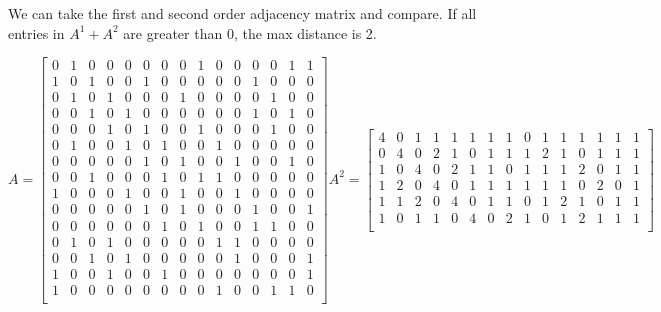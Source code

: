 \documentclass[answers]{exam}
\begin{document}
\begin{questions}
\begin{solution}
			We can take the first and second order adjacency matrix and compare. If all entries in $A^1 + A^2$ are greater than 0, the max distance is 2.
				
				{\setlength{\arraycolsep}{2pt} \[
				A = \begin{bmatrix}
				0 & 1 & 0 & 0 & 0 & 0 & 0 & 0 & 1 & 0 & 0 & 0 & 0 & 1 & 1 \\
				1 & 0 & 1 & 0 & 0 & 1 & 0 & 0 & 0 & 0 & 0 & 1 & 0 & 0 & 0 \\
				0 & 1 & 0 & 1 & 0 & 0 & 0 & 1 & 0 & 0 & 0 & 0 & 1 & 0 & 0 \\
				0 & 0 & 1 & 0 & 1 & 0 & 0 & 0 & 0 & 0 & 0 & 1 & 0 & 1 & 0 \\
				0 & 0 & 0 & 1 & 0 & 1 & 0 & 0 & 1 & 0 & 0 & 0 & 1 & 0 & 0 \\
				0 & 1 & 0 & 0 & 1 & 0 & 1 & 0 & 0 & 1 & 0 & 0 & 0 & 0 & 0 \\
				0 & 0 & 0 & 0 & 0 & 1 & 0 & 1 & 0 & 0 & 1 & 0 & 0 & 1 & 0 \\
				0 & 0 & 1 & 0 & 0 & 0 & 1 & 0 & 1 & 1 & 0 & 0 & 0 & 0 & 0 \\
				1 & 0 & 0 & 0 & 1 & 0 & 0 & 1 & 0 & 0 & 1 & 0 & 0 & 0 & 0 \\
				0 & 0 & 0 & 0 & 0 & 1 & 0 & 1 & 0 & 0 & 0 & 1 & 0 & 0 & 1 \\
				0 & 0 & 0 & 0 & 0 & 0 & 1 & 0 & 1 & 0 & 0 & 1 & 1 & 0 & 0 \\
				0 & 1 & 0 & 1 & 0 & 0 & 0 & 0 & 0 & 1 & 1 & 0 & 0 & 0 & 0 \\
				0 & 0 & 1 & 0 & 1 & 0 & 0 & 0 & 0 & 0 & 1 & 0 & 0 & 0 & 1 \\
				1 & 0 & 0 & 1 & 0 & 0 & 1 & 0 & 0 & 0 & 0 & 0 & 0 & 0 & 1 \\
				1 & 0 & 0 & 0 & 0 & 0 & 0 & 0 & 0 & 1 & 0 & 0 & 1 & 1 & 0 \\
				\end{bmatrix}
				A^2 = \begin{bmatrix}
					4 & 0 & 1 & 1 & 1 & 1 & 1 & 1 & 0 & 1 & 1 & 1 & 1 & 1 & 1 \\
					0 & 4 & 0 & 2 & 1 & 0 & 1 & 1 & 1 & 2 & 1 & 0 & 1 & 1 & 1 \\
					1 & 0 & 4 & 0 & 2 & 1 & 1 & 0 & 1 & 1 & 1 & 2 & 0 & 1 & 1 \\
					1 & 2 & 0 & 4 & 0 & 1 & 1 & 1 & 1 & 1 & 1 & 0 & 2 & 0 & 1 \\
					1 & 1 & 2 & 0 & 4 & 0 & 1 & 1 & 0 & 1 & 2 & 1 & 0 & 1 & 1 \\
					1 & 0 & 1 & 1 & 0 & 4 & 0 & 2 & 1 & 0 & 1 & 2 & 1 & 1 & 1 \\

\end{bmatrix}\]}
\end{solution}
\end{questions}
\end{document}
